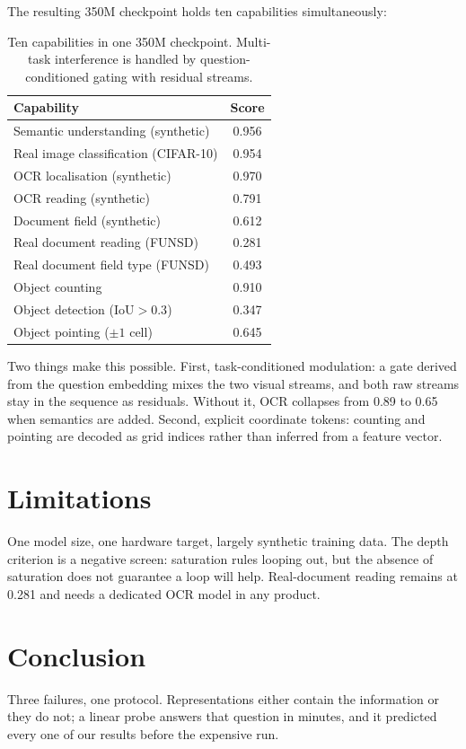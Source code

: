 \documentclass[10pt,twocolumn,letterpaper]{article}
\begin{document}
The resulting 350M checkpoint holds ten capabilities simultaneously:

\begin{table}[t]
\centering
\small
\begin{tabular}{lc}
\toprule
Capability & Score \\
\midrule
Semantic understanding (synthetic) & 0.956 \\
Real image classification (CIFAR-10) & 0.954 \\
OCR localisation (synthetic) & 0.970 \\
OCR reading (synthetic) & 0.791 \\
Document field (synthetic) & 0.612 \\
Real document reading (FUNSD) & 0.281 \\
Real document field type (FUNSD) & 0.493 \\
Object counting & 0.910 \\
Object detection (IoU$>0.3$) & 0.347 \\
Object pointing ($\pm1$ cell) & 0.645 \\
\bottomrule
\end{tabular}
\caption{Ten capabilities in one 350M checkpoint. Multi-task interference is
handled by question-conditioned gating with residual streams.}
\label{tab:matrix}
\end{table}

Two things make this possible. First, task-conditioned modulation: a gate
derived from the question embedding mixes the two visual streams, and both raw
streams stay in the sequence as residuals. Without it, OCR collapses from
0.89 to 0.65 when semantics are added. Second, explicit coordinate tokens:
counting and pointing are decoded as grid indices rather than inferred from a
feature vector.

\section{Limitations}

One model size, one hardware target, largely synthetic training data. The
depth criterion is a negative screen: saturation rules looping out, but the
absence of saturation does not guarantee a loop will help. Real-document
reading remains at 0.281 and needs a dedicated OCR model in any product.

\section{Conclusion}

Three failures, one protocol. Representations either contain the information
or they do not; a linear probe answers that question in minutes, and it
predicted every one of our results before the expensive run.



\end{document}
